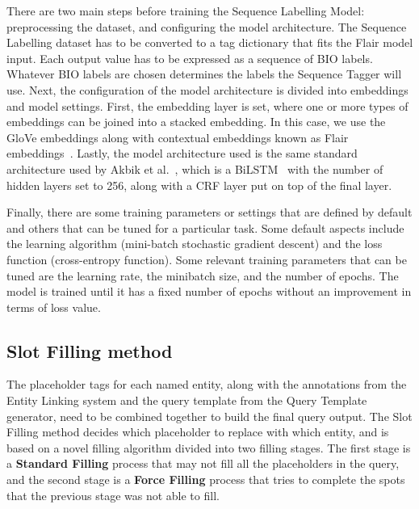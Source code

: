 There are two main steps before training the Sequence Labelling Model: preprocessing the 
dataset, and configuring the model architecture. The Sequence Labelling dataset has to be 
converted to a tag dictionary that fits the Flair model input. Each output value has to be 
expressed as a sequence of BIO labels. Whatever BIO labels are chosen determines the labels 
the Sequence Tagger will use. Next, the configuration of the model architecture is divided 
into embeddings and model settings. First, the embedding layer is set, where one or more 
types of embeddings can be joined into a stacked embedding. In this case, we use the GloVe 
embeddings along with contextual embeddings known as Flair embeddings~\cite{seqlab:flair-AkbikBBRSV19}. 
Lastly, the model architecture used is the same standard architecture used by 
Akbik et al.~\cite{seqlab:contextual-emb-AkbikBV18}, which is a BiLSTM~\cite{seqlab:HuangXY15} 
with the number of hidden layers set to 256, along with a CRF layer put on top of the final 
layer. 

Finally, there are some training parameters or settings that are defined by default and 
others that can be tuned for a particular task. Some default aspects include the learning 
algorithm (mini-batch stochastic gradient descent) and the loss function (cross-entropy 
function). Some relevant training parameters that can be tuned are the learning rate, the 
minibatch size, and the number of epochs. The model is trained until it has a fixed number of 
epochs without an improvement in terms of loss value.

\subsection{Slot Filling method}
\label{cap3:system/slotFillModule/fillingMethod}
The placeholder tags for each named entity, along with the annotations from the Entity 
Linking system and the query template from the Query Template generator, need to be combined 
together to build the final \SPARQL{} query output. The Slot Filling method decides which 
placeholder to replace with which entity, and is based on a novel filling algorithm divided 
into two filling stages. The first stage is a \textbf{Standard Filling} process that may not 
fill all the placeholders in the query, and the second stage is a \textbf{Force Filling} 
process that tries to complete the spots that the previous stage was not able to fill.

